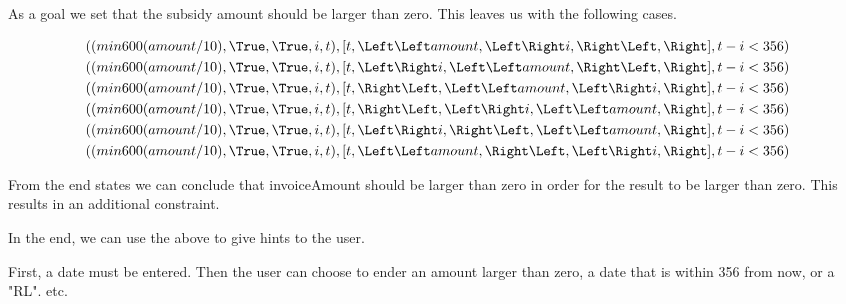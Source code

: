 As a goal we set that the subsidy amount should be larger than zero. This leaves us with the following cases.


\begin{align*}
  ((min 600 (amount/10)&,  \True, \True, i, t),[t,\Left \Left amount,     \Left \Right i, \Right \Left, \Right],t-i<356)\\
  ((min 600 (amount/10)&,  \True, \True, i, t),[t,    \Left \Right i, \Left \Left amount, \Right \Left, \Right],t-i<356)\\
  ((min 600 (amount/10)&,  \True, \True, i, t),[t,      \Right \Left, \Left \Left amount, \Left \Right i, \Right],t-i<356)\\
  ((min 600 (amount/10)&,  \True, \True, i, t),[t,      \Right \Left, \Left \Right i, \Left \Left amount, \Right],t-i<356)\\
  ((min 600 (amount/10)&,  \True, \True, i, t),[t,    \Left \Right i, \Right \Left, \Left \Left amount, \Right],t-i<356)\\
  ((min 600 (amount/10)&,  \True, \True, i, t),[t,\Left \Left amount, \Right \Left, \Left \Right i, \Right],t-i<356)\\
\end{align*}

From the end states we can conclude that invoiceAmount should be larger than zero in order for the result to be larger than zero. This results in an additional constraint.

In the end, we can use the above to give hints to the user.

First, a date must be entered. Then the user can choose to ender an amount larger than zero, a date that is within 356 from now, or a "RL".
etc.
